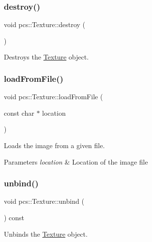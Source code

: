 \subsubsection{\texorpdfstring{destroy()}{destroy()}}
{\footnotesize\ttfamily void pcs\+::\+Texture\+::destroy (\begin{DoxyParamCaption}{ }\end{DoxyParamCaption})}



Destroys the \hyperlink{classpcs_1_1Texture}{Texture} object. 

\mbox{\label{classpcs_1_1Texture_a7cedaff72d12b58ace397f7ef4de23f3}} 
\subsubsection{\texorpdfstring{load\+From\+File()}{loadFromFile()}}
{\footnotesize\ttfamily void pcs\+::\+Texture\+::load\+From\+File (\begin{DoxyParamCaption}\item[{const char $\ast$}]{location }\end{DoxyParamCaption})}



Loads the image from a given file. 


\begin{DoxyParams}{Parameters}
{\em location} & Location of the image file \\
\hline
\end{DoxyParams}
\mbox{\label{classpcs_1_1Texture_a8893d66d0d51a3d7ae8b6ec70f7076a1}} 
\subsubsection{\texorpdfstring{unbind()}{unbind()}}
{\footnotesize\ttfamily void pcs\+::\+Texture\+::unbind (\begin{DoxyParamCaption}{ }\end{DoxyParamCaption}) const}



Unbinds the \hyperlink{classpcs_1_1Texture}{Texture} object. 



